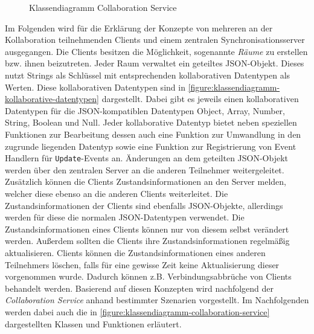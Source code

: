 \begin{figure}[tbp]
    \caption{Klassendiagramm Collaboration Service}
    \label{figure:klassendiagramm-collaboration-service}
\end{figure}

Im Folgenden wird für die Erklärung der Konzepte von mehreren an der Kollaboration teilnehmenden Clients und einem zentralen Synchronisationsserver ausgegangen. Die Clients besitzen die Möglichkeit, sogenannte \textit{Räume} zu erstellen bzw. ihnen beizutreten. Jeder Raum verwaltet ein geteiltes JSON-Objekt. Dieses nutzt Strings als Schlüssel mit entsprechenden kollaborativen Datentypen als Werten. Diese kollaborativen Datentypen sind in \autoref{figure:klassendiagramm-kollaborative-datentypen} dargestellt. Dabei gibt es jeweils einen kollaborativen Datentypen für die JSON-kompatiblen Datentypen Object, Array, Number, String, Boolean und Null. Jeder kollaborative Datentyp bietet neben speziellen Funktionen zur Bearbeitung dessen auch eine Funktion zur Umwandlung in den zugrunde liegenden Datentyp sowie eine Funktion zur Registrierung von Event Handlern für \texttt{Update}-Events an. Änderungen an dem geteilten JSON-Objekt werden über den zentralen Server an die anderen Teilnehmer weitergeleitet. Zusätzlich können die Clients Zustandsinformationen an den Server melden, welcher diese ebenso an die anderen Clients weiterleitet. Die Zustandsinformationen der Clients sind ebenfalls JSON-Objekte, allerdings werden für diese die normalen JSON-Datentypen verwendet. Die Zustandsinformationen eines Clients können nur von diesem selbst verändert werden. Außerdem sollten die Clients ihre Zustandsinformationen regelmäßig aktualisieren. Clients können die Zustandsinformationen eines anderen Teilnehmers löschen, falls für eine gewisse Zeit keine Aktualisierung dieser vorgenommen wurde. Dadurch können z.B. Verbindungsabbrüche von Clients behandelt werden. Basierend auf diesen Konzepten wird nachfolgend der \textit{Collaboration Service} anhand bestimmter Szenarien vorgestellt. Im Nachfolgenden werden dabei auch die in \autoref{figure:klassendiagramm-collaboration-service} dargestellten Klassen und Funktionen erläutert.

